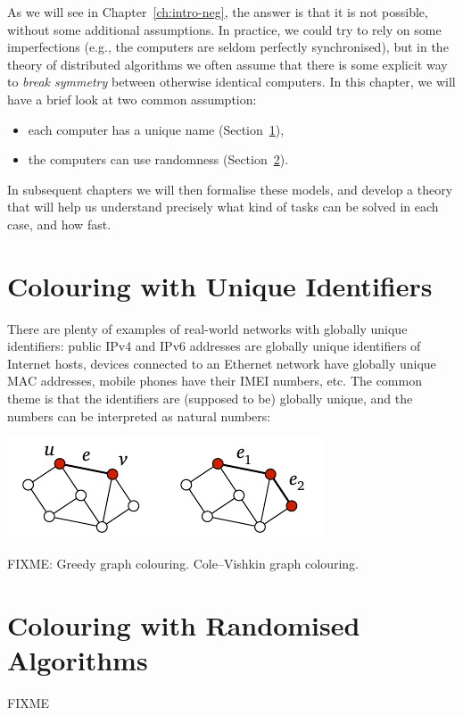 As we will see in Chapter~\ref{ch:intro-neg}, the answer is that it is not possible, without some additional assumptions. In practice, we could try to rely on some imperfections (e.g., the computers are seldom perfectly synchronised), but in the theory of distributed algorithms we often assume that there is some explicit way to \emph{break symmetry} between otherwise identical computers. In this chapter, we will have a brief look at two common assumption:
\begin{itemize}[noitemsep]
    \item each computer has a unique name (Section~\ref{sec:intro-pos-id}),
    \item the computers can use randomness (Section~\ref{sec:intro-pos-random}).
\end{itemize}
In subsequent chapters we will then formalise these models, and develop a theory that will help us understand precisely what kind of tasks can be solved in each case, and how fast.


\section{Colouring with Unique Identifiers}\label{sec:intro-pos-id}

There are plenty of examples of real-world networks with globally unique identifiers: public IPv4 and IPv6 addresses are globally unique identifiers of Internet hosts, devices connected to an Ethernet network have globally unique MAC addresses, mobile phones have their IMEI numbers, etc. The common theme is that the identifiers are (supposed to be) globally unique, and the numbers can be interpreted as natural numbers:
\begin{center}
    \includegraphics[page=\PIntroId]{figs.pdf}
\end{center}
FIXME: Greedy graph colouring. Cole--Vishkin graph colouring.

\section{Colouring with Randomised Algorithms}\label{sec:intro-pos-random}

FIXME
